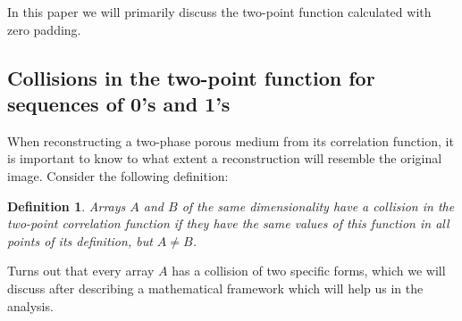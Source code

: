 \documentclass[12pt, a4paper]{article}
\newtheorem{definition}{Definition}
\begin{document}
In this paper we will primarily discuss the two-point function calculated with
zero padding.

\subsection{Collisions in the two-point function for sequences of 0's and 1's}
When reconstructing a two-phase porous medium from its correlation function, it
is important to know to what extent a reconstruction will resemble the original
image. Consider the following definition:
\begin{definition}
  Arrays $A$ and $B$ of the same dimensionality have a collision in the
  two-point correlation function if they have the same values of this function
  in all points of its definition, but $A \ne B$.
\end{definition}

Turns out that every array $A$ has a collision of two specific forms, which we
will discuss after describing a mathematical framework which will help us in the
analysis.
\end{document}
